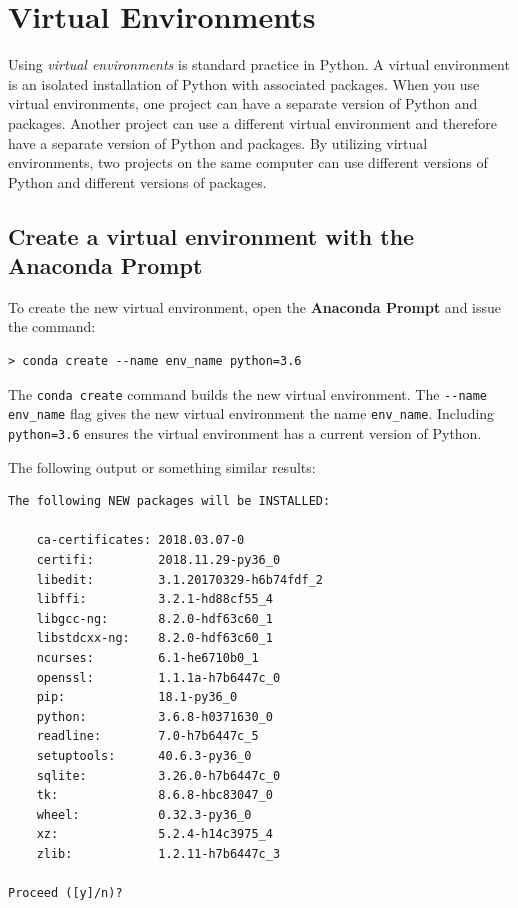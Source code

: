 \documentclass{book}
\begin{document}
    
        \section{Virtual Environments}\label{virtual-environments}
    




    
        Using \emph{virtual environments} is standard practice in Python. A
virtual environment is an isolated installation of Python with
associated packages. When you use virtual environments, one project can
have a separate version of Python and packages. Another project can use
a different virtual environment and therefore have a separate version of
Python and packages. By utilizing virtual environments, two projects on
the same computer can use different versions of Python and different
versions of packages.
    




    
        \subsection{Create a virtual environment with the Anaconda
Prompt}\label{create-a-virtual-environment-with-the-anaconda-prompt}

To create the new virtual environment, open the \textbf{Anaconda Prompt}
and issue the command:

\begin{lstlisting}
> conda create --name env_name python=3.6
\end{lstlisting}

The \lstinline!conda create! command builds the new virtual environment.
The \lstinline!--name env_name! flag gives the new virtual environment
the name \lstinline!env_name!. Including \lstinline!python=3.6! ensures
the virtual environment has a current version of Python.

The following output or something similar results:

\begin{lstlisting}
The following NEW packages will be INSTALLED:

    ca-certificates: 2018.03.07-0           
    certifi:         2018.11.29-py36_0      
    libedit:         3.1.20170329-h6b74fdf_2
    libffi:          3.2.1-hd88cf55_4       
    libgcc-ng:       8.2.0-hdf63c60_1       
    libstdcxx-ng:    8.2.0-hdf63c60_1       
    ncurses:         6.1-he6710b0_1         
    openssl:         1.1.1a-h7b6447c_0      
    pip:             18.1-py36_0            
    python:          3.6.8-h0371630_0       
    readline:        7.0-h7b6447c_5         
    setuptools:      40.6.3-py36_0          
    sqlite:          3.26.0-h7b6447c_0      
    tk:              8.6.8-hbc83047_0       
    wheel:           0.32.3-py36_0          
    xz:              5.2.4-h14c3975_4       
    zlib:            1.2.11-h7b6447c_3      

Proceed ([y]/n)?
\end{lstlisting}
\end{document}
